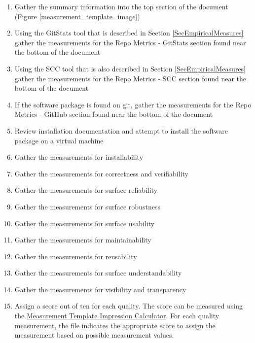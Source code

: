 \documentclass[letterpaper,cleveref]{lipics-v2019}
\theoremstyle{definition}
\begin{document}
\begin{enumerate} 
	\item Gather the summary information into the top section of the document (Figure \ref{measurement_template_image})
	\item Using the GitStats tool that is described in Section \ref{SecEmpiricalMeasures} gather the measurements for the Repo Metrics - GitStats section found near the bottom of the document
	\item Using the SCC tool that is also described in Section \ref{SecEmpiricalMeasures} gather the measurements for the Repo Metrics - SCC section found near the bottom of the document
	\item If the software package is found on git, gather the measurements for the Repo Metrics - GitHub section found near the bottom of the document
	\item Review installation documentation and attempt to install the software package on a virtual machine
	\item Gather the measurements for installability
	\item Gather the measurements for correctness and verifiability
	\item Gather the measurements for surface reliability
	\item Gather the measurements for surface robustness
	\item Gather the measurements for surface usability
	\item Gather the measurements for maintainability
	\item Gather the measurements for reusability
	\item Gather the measurements for surface understandability
	\item Gather the measurements for visibility and transparency
	\item Assign a score out of ten for each quality. The score can be measured using the \href{https://github.com/smiths/AIMSS/blob/master/StateOfPractice/Methodology/MeasurementTemplate_ImpressionCalculator.xlsx}{Measurement Template Impression Calculator}. For each quality measurement, the file indicates the appropriate score to assign the measurement based on possible measurement values.
\end{enumerate}
\end{document}
